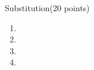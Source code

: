 \documentclass{article}
\begin{document}
\begin{question}{Substitution}{(20 points)}
\begin{subquestion}
  
\end{subquestion}


\begin{subquestion}

  
 

 \begin{enumerate}
     \item 
     \item 
     \item
     \item 
 \end{enumerate}
\end{subquestion}

\begin{subquestion}


\end{subquestion}

\end{question}
\end{document}
